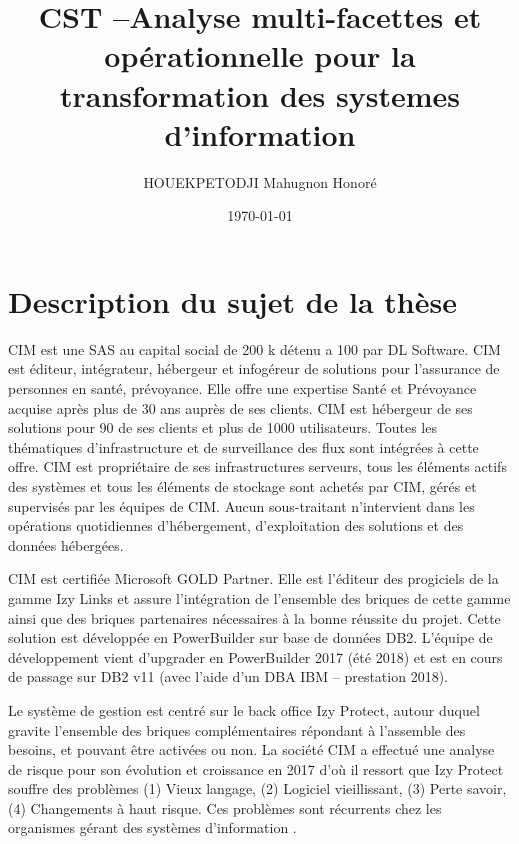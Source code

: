 \documentclass[a4paper]{article}
\title{CST --Analyse multi-facettes et opérationnelle pour la transformation des systemes d’information}
\author{ HOUEKPETODJI Mahugnon Honoré}
\begin{document}
\institution{}

\date{\today}

\maketitle

\section{Description du sujet de la thèse}
CIM est une SAS au capital social de 200 k détenu a 100 par DL Software. 
CIM est éditeur, intégrateur, hébergeur et infogéreur de solutions pour l'assurance de personnes en santé, prévoyance. 
Elle offre une expertise Santé et Prévoyance acquise après plus de 30 ans auprès de ses clients. 
CIM est hébergeur de ses solutions pour 90 de ses clients et plus de 1000 utilisateurs. 
Toutes les thématiques d'infrastructure et de surveillance des flux sont intégrées à cette offre.
CIM est propriétaire de ses infrastructures serveurs, tous les éléments actifs des systèmes et tous les éléments de stockage sont achetés par CIM, gérés et supervisés par les équipes de CIM. Aucun sous-traitant n'intervient dans les opérations quotidiennes d'hébergement, d'exploitation des solutions et des données hébergées.

CIM est certifiée Microsoft GOLD Partner. 
Elle est l'éditeur des progiciels de la gamme Izy Links et assure l'intégration de l'ensemble des briques de cette gamme ainsi que des briques partenaires nécessaires à la bonne réussite du projet. Cette solution est développée en PowerBuilder sur base de données DB2. L'équipe de développement vient d'upgrader en PowerBuilder 2017 (été 2018) et est en cours de passage sur DB2 v11 (avec l'aide d'un DBA IBM – prestation 2018).

Le système de gestion est centré sur le back office Izy Protect, autour duquel gravite l'ensemble des briques complémentaires répondant à l'assemble des besoins, et pouvant être activées ou non. 
La société CIM a effectué une analyse de risque pour son évolution et croissance en 2017 d'où il ressort que Izy Protect souffre des problèmes 
(1) Vieux langage,
(2) Logiciel vieillissant,
(3) Perte savoir,
(4) Changements à haut risque.
Ces problèmes sont récurrents chez les organismes gérant des systèmes d'information \cite{Deme02a}.
\end{document}
